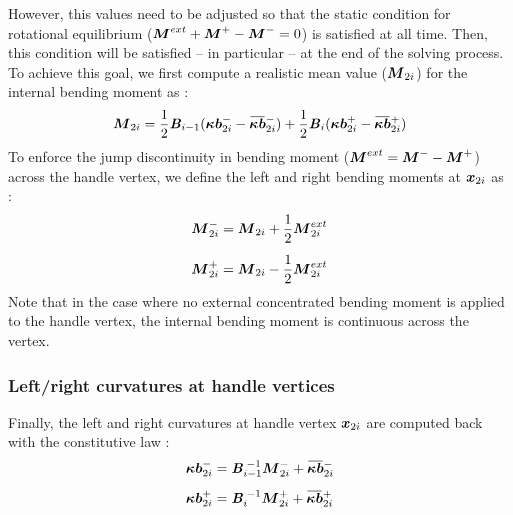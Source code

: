 However, this values need to be adjusted so that the static condition for rotational equilibrium ($\boldsymbol{M}^{ext}  + \boldsymbol{M}^+ - \boldsymbol{M}^- = 0$) is satisfied at all time. Then, this condition will be satisfied -- in particular -- at the end of the solving process. To achieve this goal, we first compute a realistic mean value ($\boldsymbol{M}_{2i}$) for the internal bending moment as :
\begin{equation}
		\vect{M}_{2i} 	=  \frac{1}{2} \mat{B}_{i-1}(\vect{\kappa b}_{2i}^- - \overbar{\vect{\kappa b}}_{2i}^-)
					+  \frac{1}{2} \mat{B}_{i}(\vect{\kappa b}_{2i}^+ - \overbar{\vect{\kappa b}}_{2i}^+)
\end{equation}
To enforce the jump discontinuity in bending moment ($\boldsymbol{M}^{ext} = \boldsymbol{M}^- - \boldsymbol{M}^+$) across the handle vertex, we define the left and right bending moments at $\boldsymbol{x}_{2i}$ as :
\begin{subequations}
	\begin{align}
		\boldsymbol{M}_{2i}^- 	&=  \boldsymbol{M}_{2i} + \frac{1}{2} \boldsymbol{M}_{2i}^{ext} 
		\\[0.5em]
		\boldsymbol{M}_{2i}^+ 	&=  \boldsymbol{M}_{2i} - \frac{1}{2} \boldsymbol{M}_{2i}^{ext} 
	\end{align}
\end{subequations}
Note that in the case where no external concentrated bending moment is applied to the handle vertex, the internal bending moment is continuous across the vertex.

\subsubsection{Left/right curvatures at handle vertices}

Finally, the left and right curvatures at handle vertex $\boldsymbol{x}_{2i}$ are computed back with the constitutive law :
\begin{subequations}
	\begin{align}
		\vect{\kappa b}_{2i}^-  &=  \mat{B}_{i-1}^{\;-1} \vect{M}_{2i}^- + \overbar{\vect{\kappa b}}_{2i}^- 
		\\[0.5em]
		\vect{\kappa b}_{2i}^+  &=  \mat{B}_{i}^{\;-1} \vect{M}_{2i}^+ + \overbar{\vect{\kappa b}}_{2i}^+ 
	\end{align}
\end{subequations}

